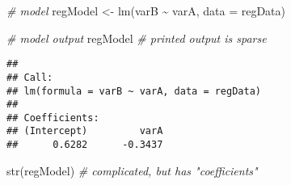 \documentclass[
]{article}
\newenvironment{Shaded}{\begin{snugshade}}{\end{snugshade}}
\newcommand{\AttributeTok}[1]{\textcolor[rgb]{0.77,0.63,0.00}{#1}}
\newcommand{\CommentTok}[1]{\textcolor[rgb]{0.56,0.35,0.01}{\textit{#1}}}
\newcommand{\FunctionTok}[1]{\textcolor[rgb]{0.00,0.00,0.00}{#1}}
\newcommand{\NormalTok}[1]{#1}
\newcommand{\OtherTok}[1]{\textcolor[rgb]{0.56,0.35,0.01}{#1}}
\newcommand{\SpecialCharTok}[1]{\textcolor[rgb]{0.00,0.00,0.00}{#1}}
\begin{document}
\begin{Shaded}
\begin{Highlighting}[]
\CommentTok{\# model}
\NormalTok{regModel }\OtherTok{\textless{}{-}} \FunctionTok{lm}\NormalTok{(varB }\SpecialCharTok{\textasciitilde{}}\NormalTok{ varA, }\AttributeTok{data =}\NormalTok{ regData)}

\CommentTok{\# model output}
\NormalTok{regModel }\CommentTok{\# printed output is sparse}
\end{Highlighting}
\end{Shaded}

\begin{verbatim}
## 
## Call:
## lm(formula = varB ~ varA, data = regData)
## 
## Coefficients:
## (Intercept)         varA  
##      0.6282      -0.3437
\end{verbatim}

\begin{Shaded}
\begin{Highlighting}[]
\FunctionTok{str}\NormalTok{(regModel) }\CommentTok{\# complicated, but has "coefficients"}
\end{Highlighting}
\end{Shaded}
\end{document}
